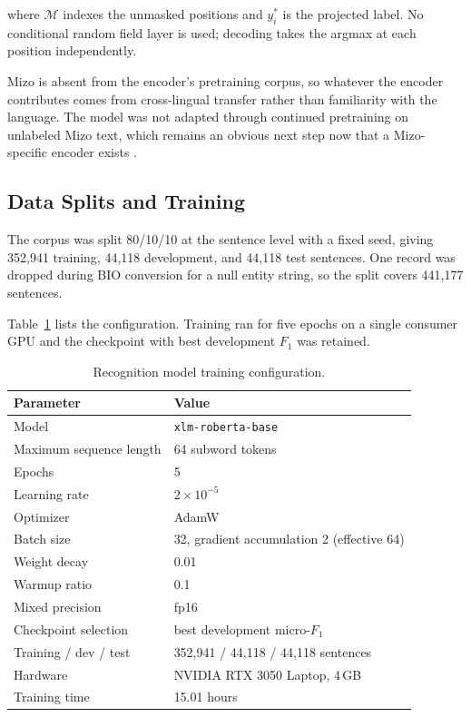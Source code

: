 \documentclass[acmsmall,screen,review]{acmart}
\begin{document}
where $\mathcal{M}$ indexes the unmasked positions and $y_i^{\ast}$ is the
projected label. No conditional random field layer is used; decoding takes the
argmax at each position independently.

Mizo is absent from the encoder's pretraining corpus, so whatever the encoder
contributes comes from cross-lingual transfer rather than familiarity with the
language. The model was not adapted through continued pretraining on unlabeled
Mizo text, which remains an obvious next step now that a Mizo-specific encoder
exists \citep{lalramhluna2024mizbert}.

\subsection{Data Splits and Training}
\label{sec:model:training}

The corpus was split 80/10/10 at the sentence level with a fixed seed, giving
352,941 training, 44,118 development, and 44,118 test sentences. One record was
dropped during BIO conversion for a null entity string, so the split covers
441,177 sentences.

Table~\ref{tab:training_config} lists the configuration. Training ran for five
epochs on a single consumer GPU and the checkpoint with best development $F_1$
was retained.

\begin{table}[htbp]
\centering
\caption{Recognition model training configuration.}
\label{tab:training_config}
\begin{tabular}{ll}
\hline
\textbf{Parameter} & \textbf{Value} \\
\hline
Model                   & \texttt{xlm-roberta-base} \\
Maximum sequence length & 64 subword tokens \\
Epochs                  & 5 \\
Learning rate           & $2 \times 10^{-5}$ \\
Optimizer               & AdamW \citep{loshchilov2019adamw} \\
Batch size              & 32, gradient accumulation 2 (effective 64) \\
Weight decay            & 0.01 \\
Warmup ratio            & 0.1 \\
Mixed precision         & fp16 \\
Checkpoint selection    & best development micro-$F_1$ \\
Training / dev / test   & 352,941 / 44,118 / 44,118 sentences \\
Hardware                & NVIDIA RTX 3050 Laptop, 4\,GB \\
Training time           & 15.01 hours \\
\hline
\end{tabular}
\end{table}
\end{document}
